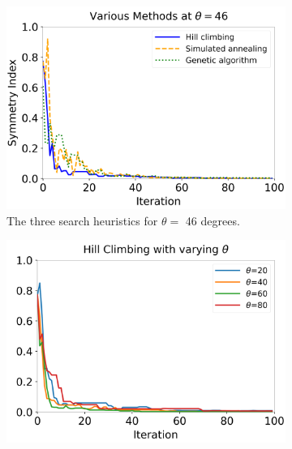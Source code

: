 

\begin{figure}
    \centering
    \begin{subfigure}[t]{0.49\textwidth}
	\includegraphics[width=\textwidth]{chapters/tqc/figures/symmetry_varymethod.png}
	\caption{The three search heuristics for $\theta = $ 46 degrees. }
        \label{fig:symmetry-methods}
    \end{subfigure}
    \qquad
    \hspace{-0.3in}
    \begin{subfigure}[t]{0.49\textwidth}
	\includegraphics[width=\textwidth]{chapters/tqc/figures/symmetry_varytheta.png}

\end{subfigure}
\end{figure}
